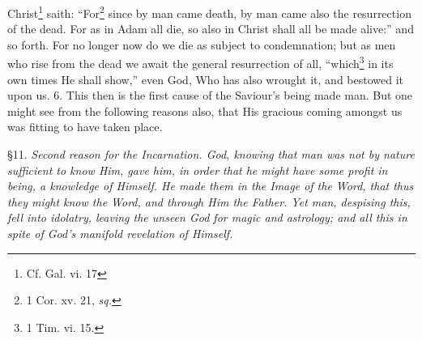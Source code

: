 Christ\footnote{Cf. Gal. vi. 17} saith: “For\footnote{1 Cor. xv. 21, \emph{sq.}} since by man came death, by man came also the resurrection of the dead. For as in Adam all die, so also in Christ shall all be made alive:” and so forth. For no longer now do we die as subject to condemnation; but as men who rise from the dead we await the general resurrection of all, “which\footnote{1 Tim. vi. 15.} in its own times He shall show,” even God, Who has also wrought it, and bestowed it upon us. 6. This then is the first cause of the Saviour’s being made man. But one might see from the following reasons also, that His gracious coming amongst us was fitting to have taken place.


§11. \emph{Second reason for the Incarnation. God, knowing that man was not by nature sufficient to know Him, gave him, in order that he might have some profit in being, a knowledge of Himself. He made them in the Image of the Word, that thus they might know the Word, and through Him the Father. Yet man, despising this, fell into idolatry, leaving the unseen God for magic and astrology; and all this in spite of God’s manifold revelation of Himself.}

